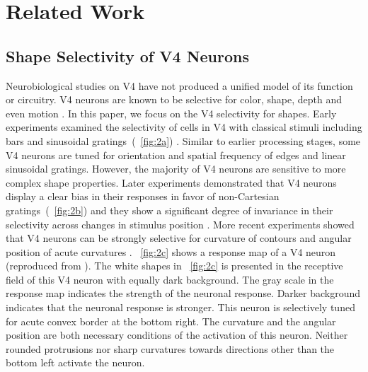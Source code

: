 \documentclass[conference]{IEEEtran}
\begin{document}
\section{Related Work}
\label{sec:2}

\subsection{Shape Selectivity of V4 Neurons}

Neurobiological studies on V4 have not produced a unified model of its function or circuitry.
V4 neurons are known to be selective for color, shape, depth and even motion \cite{roe2012}.
In this paper, we focus on the V4 selectivity for shapes. 
Early experiments examined the selectivity of cells in V4 
with classical stimuli including bars and sinusoidal gratings~(\figurename~\ref{fig:2a}) \cite{desimone1987}.
Similar to earlier processing stages, some V4 neurons are tuned for orientation 
and spatial frequency of edges and linear sinusoidal gratings.
However, the majority of V4 neurons are sensitive to more complex shape properties. 
Later experiments demonstrated that V4 neurons display a clear bias in their responses 
in favor of non-Cartesian gratings~(\figurename~\ref{fig:2b}) and they show a significant degree of invariance 
in their selectivity across changes in stimulus position \cite{gallant1996}.
More recent experiments showed that V4 neurons can be strongly selective for curvature
of contours and angular position of acute curvatures \cite{pasupathy1999,pasupathy2001}. 
\figurename~\ref{fig:2c} shows a response map of a V4 neuron
(reproduced from \cite{pasupathy2001}).
The white shapes in \figurename~\ref{fig:2c} is presented in the receptive field of this V4 neuron
with equally dark background. 
The gray scale in the response map indicates the strength of the neuronal response.
Darker background indicates that the neuronal response is stronger.
This neuron is selectively tuned for acute convex border at the bottom right.
The curvature and the angular position are both necessary conditions of the activation of this neuron.
Neither rounded protrusions nor sharp curvatures towards directions other than the bottom left
activate the neuron.
\end{document}

